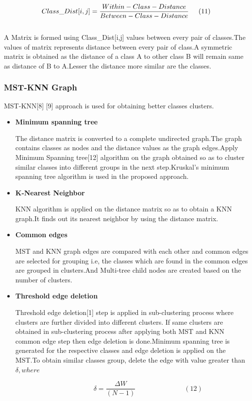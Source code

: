 \documentclass[a4paper, 10pt, conference]{ieeeconf}      %
\begin{document}
\[Class\_Dist[i,j]=\frac{Within-Class-Distance}{Between-Class-Distance}\hspace{0.5cm}(11)\] \\
A Matrix is formed using Class\_Dist[i,j] values between every pair of classes.The values of matrix represents distance between every pair of class.A symmetric matrix is obtained as the distance of a class A to other class B will remain same as distance of B to A.Lesser the distance more similar are the classes.

\subsubsection{MST-KNN Graph} 
MST-KNN[8] [9] approach is used for obtaining better classes clusters.
\begin{itemize}
\item\textbf{Minimum spanning tree}
\par
The distance matrix is converted to a complete undirected graph.The graph contains classes as nodes and the distance values as the graph edges.Apply Minimum Spanning tree[12] algorithm on the graph obtained so as to cluster similar classes into different groups in the next step.Kruskal's minimum spanning tree algorithm is used in the proposed approach.  
\item\textbf{K-Nearest Neighbor}
\par
KNN algorithm is applied on the distance matrix so as to obtain a KNN graph.It finds out its nearest neighbor by using the distance matrix.
\item\textbf{Common edges}
\par
MST and KNN graph edges are compared with each other and common edges are selected for grouping i.e, the classes which are found in the common edges are grouped in clusters.And Multi-tree child nodes are created based on the number of clusters. 
\item\textbf{Threshold edge deletion}
\par
Threshold edge deletion[1] step is applied in sub-clustering process where clusters are further divided into different clusters. If same clusters are obtained in sub-clustering process after applying both MST and KNN common edge step then edge deletion is done.Minimum spanning tree is generated for the respective classes and edge deletion is applied on the MST.To obtain similar classes group, delete the edge with value greater than $\delta,where$ 
\par
\[\hspace{2cm}\delta = \frac{\Delta W}{(N-1)}\hspace{3cm}(12)\] \\


\end{itemize}
\end{document}
